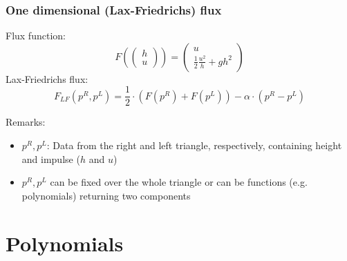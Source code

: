 \documentclass{beamer}
\newcommand{\todo}[1]{
  \textcolor{red}{TODO: #1}
  \note{\textcolor{red}{TODO: #1}}
}
\renewcommand{\todo}[1]{}
\begin{document}
\begin{frame}
  \frametitle{One dimensional (Lax-Friedrichs) flux}
  Flux function:
  \begin{equation}
    \label{eq:flux-function-definition}
    F\left(
      \begin{pmatrix}
        h \\ u
      \end{pmatrix}
    \right) = 
    \begin{pmatrix}
      u \\
      \frac{1}{2} \frac{u^2}{h} + g h^2 
    \end{pmatrix}
  \end{equation}
  Lax-Friedrichs flux:
  \begin{equation}
    \label{eq:lax-friedrich-definition}
    F_{LF}(p^R,p^L) = \dfrac{1}{2}\cdot (F(p^R) + F(p^L)) - \alpha \cdot (p^R - p^L)
  \end{equation}
  \begin{block}{Remarks:}
    \begin{itemize}
    \item $p^R, p^L$: Data from the right and left triangle, respectively, containing height and impulse ($h$ and $u$)
    \item $p^R, p^L$ can be fixed over the whole triangle or can be functions (e.g. polynomials) returning two components
    \todo{Muesen wir das mit fixed ueberhaupt erwaehnen? Ist ja nur ein Spezialfall von Polynomen}
    \end{itemize}
  \end{block}
\end{frame}

\section{Polynomials}
\label{sec:constructing-polynomials}
\end{document}
